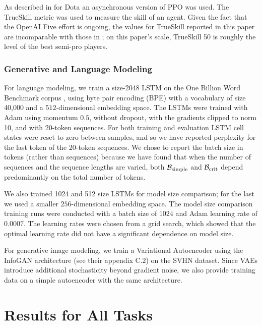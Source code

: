 \documentclass[english]{article}
\newcommand{\CB}{{\cal B}}
\begin{document}
As described in \cite{OpenAI_Five} for Dota an asynchronous version of PPO \cite{DBLP:journals/corr/SchulmanWDRK17} was used. The TrueSkill metric \cite{NIPS2006_3079} was used to measure the skill of an agent. Given the fact that the OpenAI Five effort is ongoing, the values for TrueSkill reported in this paper are incomparable with those in \cite{OpenAI_Five}; on this paper's scale, TrueSkill 50 is roughly the level of the best semi-pro players.


\subsubsection{Generative and Language Modeling}

For language modeling, we train a size-2048 LSTM \cite{Hochreiter:1997:LSM:1246443.1246450} on the One Billion Word Benchmark corpus \cite{1312.3005}, using byte pair encoding (BPE) \cite{DBLP:journals/corr/SennrichHB15} with a vocabulary of size 40,000 and a $512$-dimensional embedding space. The LSTMs were trained with Adam using momentum $0.5$, without dropout, with the gradients clipped to norm 10, and with $20$-token sequences. For both training and evaluation LSTM cell states were reset to zero between samples, and so we have reported perplexity for the last token of the 20-token sequences.   We chose to report the batch size in tokens (rather than sequences) because we have found that when the number of sequences and the sequence lengths are varied, both $\CB_{\rm simple}$ and $\CB_{\rm crit}$ depend predominantly on the total number of tokens.

We also trained 1024 and 512 size LSTMs for model size comparison; for the last we used a smaller $256$-dimensional embedding space.  The model size comparison training runs were conducted with a batch size of $1024$ and Adam learning rate of $0.0007$.  The learning rates were chosen from a grid search, which showed that the optimal learning rate did not have a significant dependence on model size.

For generative image modeling, we train a Variational Autoencoder \cite{1312.6114} using the InfoGAN architecture \cite{1606.03657} (see their appendix C.2) on the SVHN dataset. Since VAEs introduce additional stochasticity beyond gradient noise, we also provide training data on a simple autoencoder with the same architecture.

\section{Results for All Tasks}
\end{document}
